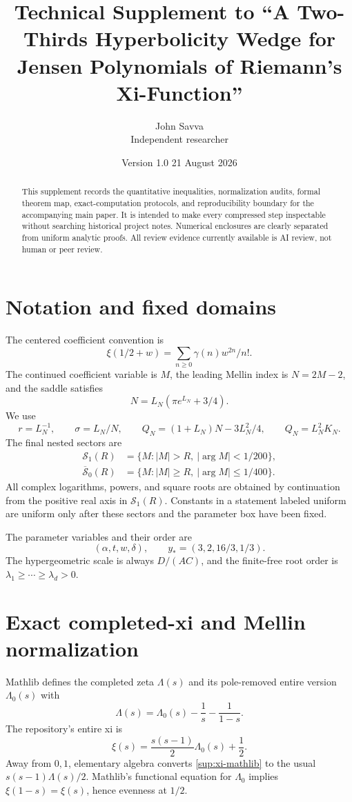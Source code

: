 \documentclass[10pt]{article}
\title{Technical Supplement to ``A Two-Thirds Hyperbolicity Wedge for Jensen Polynomials of Riemann's Xi-Function''}
\author{John Savva\\{\small Independent researcher}}
\date{Version 1.0 \textemdash{} 21 August 2026}
\begin{document}
\maketitle

\begin{abstract}
This supplement records the quantitative inequalities, normalization audits,
formal theorem map, exact-computation protocols, and reproducibility boundary
for the accompanying main paper.  It is intended to make every compressed
step inspectable without searching historical project notes.  Numerical
enclosures are clearly separated from uniform analytic proofs.  All review
evidence currently available is AI review, not human or peer review.
\end{abstract}

\tableofcontents

\section{Notation and fixed domains}\label{sup:notation}

The centered coefficient convention is
\[
 \xi(1/2+w)=\sum_{n\ge0}\gamma(n)w^{2n}/n!.
\]
The continued coefficient variable is $M$, the leading Mellin index is
$N=2M-2$, and the saddle satisfies
\[
 N=L_N(\pi e^{L_N}+3/4).
\]
We use
\[
 r=L_N^{-1},\qquad \sigma=L_N/N,\qquad
 Q_N=(1+L_N)N-3L_N^2/4,\qquad Q_N=L_N^2K_N.
\]
The final nested sectors are
\begin{align*}
 \mathcal S_1(R)&=\{M:|M|>R,\ |\arg M|<1/200\},\\
 \overline{\mathcal S}_0(R)&=\{M:|M|\ge R,\ |\arg M|\le1/400\}.
\end{align*}
All complex logarithms, powers, and square roots are obtained by continuation
from the positive real axis in $\mathcal S_1(R)$.  Constants in a statement
labeled uniform are uniform only after these sectors and the parameter box
have been fixed.

The parameter variables and their order are
\[
 (\alpha,t,w,\delta),\qquad
 y_*=(3,2,16/3,1/3).
\]
The hypergeometric scale is always $D/(AC)$, and the finite-free root order is
$\lambda_1\ge\cdots\ge\lambda_d>0$.

\section{Exact completed-xi and Mellin normalization}\label{sup:mellin}

Mathlib defines the completed zeta $\Lambda(s)$ and its pole-removed entire
version $\Lambda_0(s)$ with
\[
 \Lambda(s)=\Lambda_0(s)-\frac1s-\frac1{1-s}.
\]
The repository's entire xi is
\begin{equation}\label{sup:xi-mathlib}
 \xi(s)=\frac{s(s-1)}2\Lambda_0(s)+\frac12.
\end{equation}
Away from $0,1$, elementary algebra converts \eqref{sup:xi-mathlib} to the
usual $s(s-1)\Lambda(s)/2$.  Mathlib's functional equation for $\Lambda_0$
implies $\xi(1-s)=\xi(s)$, hence evenness at $1/2$.
\end{document}

